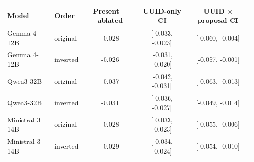 \begin{tabular}{llccc}
\toprule
Model & Order & Present $-$ ablated & UUID-only CI & UUID $\times$ proposal CI \\
\midrule
Gemma 4-12B & original & -0.028 & [-0.033, -0.023] & [-0.060, -0.004] \\
Gemma 4-12B & inverted & -0.026 & [-0.031, -0.020] & [-0.057, -0.001] \\
Qwen3-32B & original & -0.037 & [-0.042, -0.031] & [-0.063, -0.013] \\
Qwen3-32B & inverted & -0.031 & [-0.036, -0.027] & [-0.049, -0.014] \\
Ministral 3-14B & original & -0.028 & [-0.033, -0.023] & [-0.055, -0.006] \\
Ministral 3-14B & inverted & -0.029 & [-0.034, -0.024] & [-0.054, -0.010] \\
\bottomrule
\end{tabular}
